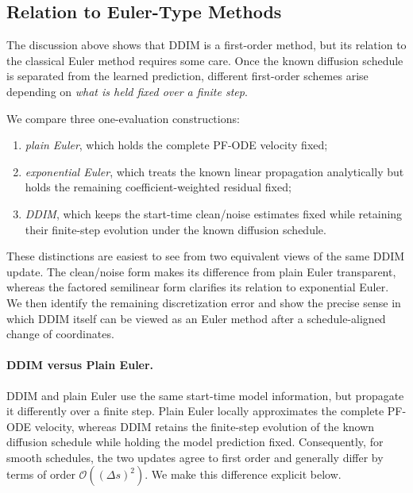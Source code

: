 \subsection{Relation to Euler-Type Methods}
\label{subsec:ddim-classical-euler}


The discussion above shows that DDIM is a first-order method, but its relation
to the classical Euler method requires some care. Once the known diffusion
schedule is separated from the learned prediction, different first-order
schemes arise depending on \emph{what is held fixed over a finite step}.

We compare three one-evaluation constructions:
\begin{enumerate}
    \item \emph{plain Euler}, which holds the complete PF-ODE velocity fixed;
    \item \emph{exponential Euler}, which treats the known linear propagation
    analytically but holds the remaining coefficient-weighted residual fixed;
    \item \emph{DDIM}, which keeps the start-time clean/noise estimates fixed
    while retaining their finite-step evolution under the known diffusion
    schedule.
\end{enumerate}
These distinctions are easiest to see from two equivalent views of the same
DDIM update. The clean/noise form makes its difference from plain Euler
transparent, whereas the factored semilinear form clarifies its relation to
exponential Euler. We then identify the remaining discretization error and
show the precise sense in which DDIM itself can be viewed as an Euler method
after a schedule-aligned change of coordinates.


\paragraph{DDIM versus Plain Euler.}
DDIM and plain Euler use the same start-time model information, but propagate
it differently over a finite step. Plain Euler locally approximates the
complete PF-ODE velocity, whereas DDIM retains the finite-step evolution of
the known diffusion schedule while holding the model prediction fixed.
Consequently, for smooth schedules, the two updates agree to first order and
generally differ by terms of order $\mathcal O((\Delta s)^2)$. We make this
difference explicit below.

